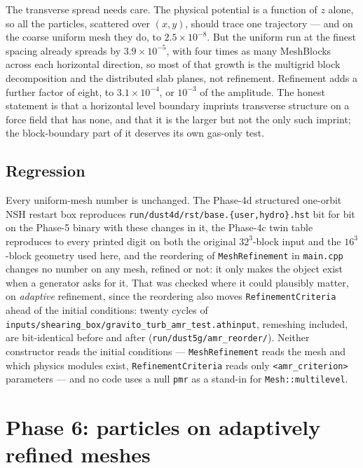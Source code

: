 \documentclass[11pt]{article}
\newcommand{\code}[1]{\texttt{#1}}
\newcommand{\file}[1]{\texttt{#1}}
\begin{document}
The transverse spread needs care. The physical potential is a function of $z$ alone, so
all the particles, scattered over $(x,y)$, should trace one trajectory --- and on the
coarse uniform mesh they do, to $2.5\times10^{-8}$. But the uniform run at the finest
spacing already spreads by $3.9\times10^{-5}$, with four times as many MeshBlocks across
each horizontal direction, so most of that growth is the multigrid block decomposition and
the distributed slab planes, not refinement. Refinement adds a further factor of eight,
to $3.1\times10^{-4}$, or $10^{-3}$ of the amplitude. The honest statement is that a
horizontal level boundary imprints transverse structure on a force field that has none,
and that it is the larger but not the only such imprint; the block-boundary part of it
deserves its own gas-only test.

\subsection{Regression}

Every uniform-mesh number is unchanged. The Phase-4d structured one-orbit NSH restart
box reproduces \file{run/dust4d/rst/base.\{user,hydro\}.hst} bit for bit on the
Phase-5 binary with these changes in it, the Phase-4c twin table reproduces to every
printed digit on both the original $32^3$-block input and the $16^3$-block geometry used
here, and the reordering of \code{MeshRefinement} in \file{main.cpp} changes no number on
any mesh, refined or not: it only makes the object exist when a generator asks for it. That
was checked where it could plausibly matter, on \emph{adaptive} refinement, since the
reordering also moves \code{RefinementCriteria} ahead of the initial conditions: twenty
cycles of \file{inputs/shearing\_box/gravito\_turb\_amr\_test.athinput}, remeshing
included, are bit-identical before and after (\file{run/dust5g/amr\_reorder/}). Neither
constructor reads the initial conditions --- \code{MeshRefinement} reads the mesh and which
physics modules exist, \code{RefinementCriteria} reads only \code{<amr\_criterion>}
parameters --- and no code uses a null \code{pmr} as a stand-in for
\code{Mesh::multilevel}.

\section{Phase 6: particles on adaptively refined meshes}
\label{sec:phase6}
\end{document}
